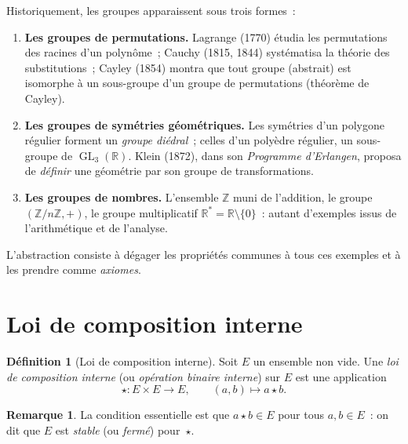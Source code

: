 \documentclass[12pt,a4paper,openany]{book}
\theoremstyle{definition}
\newtheorem{definition}{Définition}[chapter]
\newtheorem{remarque}{Remarque}[chapter]
\newcommand{\Z}{\mathbb{Z}}
\newcommand{\R}{\mathbb{R}}
\DeclareMathOperator{\GL}{GL}
\begin{document}
Historiquement, les groupes apparaissent sous trois formes~:
\begin{enumerate}[label=(\alph*)]
  \item \textbf{Les groupes de permutations.} Lagrange (1770) étudia les
    permutations des racines d'un polynôme~; Cauchy (1815, 1844)
    systématisa la théorie des substitutions~; Cayley (1854) montra que
    tout groupe (abstrait) est isomorphe à un sous-groupe d'un groupe de permutations
    (théorème de Cayley).
  \item \textbf{Les groupes de symétries géométriques.} Les symétries d'un polygone
    régulier forment un \emph{groupe diédral}~; celles d'un polyèdre régulier, un
    sous-groupe de $\GL_3(\R)$. Klein (1872), dans son \emph{Programme
    d'Erlangen}, proposa de \emph{définir} une géométrie par son groupe de
    transformations.
  \item \textbf{Les groupes de nombres.} L'ensemble $\Z$ muni de l'addition, le groupe
    $(\Z/n\Z, +)$, le groupe multiplicatif $\R^* = \R \setminus\{0\}$~: autant
    d'exemples issus de l'arithmétique et de l'analyse.
\end{enumerate}

L'abstraction consiste à dégager les propriétés communes à tous ces exemples et à les
prendre comme \emph{axiomes}.

\section{Loi de composition interne}
\label{sec:ch1-lci}

\begin{definition}[Loi de composition interne]
\label{def:lci}
Soit $E$ un ensemble non vide. Une \emph{loi de composition interne} (ou
\emph{opération binaire interne}) sur $E$ est une application
\[
  \star : E \times E \longrightarrow E, \qquad (a,b) \longmapsto a \star b.
\]
\end{definition}

\begin{remarque}
La condition essentielle est que $a \star b \in E$ pour tous $a, b \in E$~: on dit que
$E$ est \emph{stable} (ou \emph{fermé}) pour~$\star$.
\end{remarque}
\end{document}
